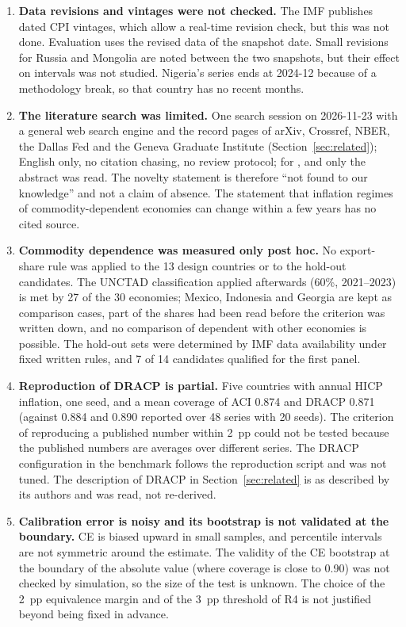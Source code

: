 \begin{enumerate}
\item \textbf{Data revisions and vintages were not checked.} The IMF publishes dated CPI vintages, which allow a real-time revision check, but this was not done. Evaluation uses the revised data of the snapshot date. Small revisions for Russia and Mongolia are noted between the two snapshots, but their effect on intervals was not studied. Nigeria's series ends at 2024-12 because of a methodology break, so that country has no recent months.
\item \textbf{The literature search was limited.} One search session on 2026-11-23 with a general web search engine and the record pages of arXiv, Crossref, NBER, the Dallas Fed and the Geneva Graduate Institute (Section~\ref{sec:related}); English only, no citation chasing, no review protocol; for \citet{brahem2026tunisia}, \citet{jetwiriyanon2025zeroshot} and \citet{michael2026tsfm} only the abstract was read. The novelty statement is therefore ``not found to our knowledge'' and not a claim of absence. The statement that inflation regimes of commodity-dependent economies can change within a few years has no cited source.
\item \textbf{Commodity dependence was measured only post hoc.} No export-share rule was applied to the 13 design countries or to the hold-out candidates. The UNCTAD classification applied afterwards (60\%, 2021--2023) is met by 27 of the 30 economies; Mexico, Indonesia and Georgia are kept as comparison cases, part of the shares had been read before the criterion was written down, and no comparison of dependent with other economies is possible. The hold-out sets were determined by IMF data availability under fixed written rules, and 7 of 14 candidates qualified for the first panel.
\item \textbf{Reproduction of DRACP is partial.} Five countries with annual HICP inflation, one seed, and a mean coverage of ACI 0.874 and DRACP 0.871 (against 0.884 and 0.890 reported over 48 series with 20 seeds). The criterion of reproducing a published number within 2~pp could not be tested because the published numbers are averages over different series. The DRACP configuration in the benchmark follows the reproduction script and was not tuned. The description of DRACP in Section~\ref{sec:related} is as described by its authors and was read, not re-derived.
\item \textbf{Calibration error is noisy and its bootstrap is not validated at the boundary.} CE is biased upward in small samples, and percentile intervals are not symmetric around the estimate. The validity of the CE bootstrap at the boundary of the absolute value (where coverage is close to 0.90) was not checked by simulation, so the size of the test is unknown. The choice of the 2~pp equivalence margin and of the 3~pp threshold of R4 is not justified beyond being fixed in advance.

\end{enumerate}
